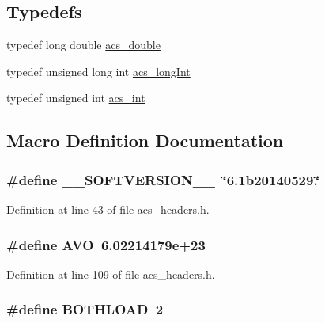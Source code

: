 \subsection*{Typedefs}
\begin{DoxyCompactItemize}
\item 
typedef long double \hyperlink{a00051_ab776853a005fcbf56af0424a2a4dd607}{acs\+\_\+double}
\item 
typedef unsigned long int \hyperlink{a00051_a19319d75f02db4308bc5c0026d98cd85}{acs\+\_\+long\+Int}
\item 
typedef unsigned int \hyperlink{a00051_a8d277355641a098190360234e2ebde35}{acs\+\_\+int}
\end{DoxyCompactItemize}


\subsection{Macro Definition Documentation}
\hypertarget{a00051_aab38659c2fe462437b89a1e85e619dc7}{
\subsubsection[{\+\_\+\+\_\+\+S\+O\+F\+T\+V\+E\+R\+S\+I\+O\+N\+\_\+\+\_\+}]{\setlength{\rightskip}{0pt plus 5cm}\#define \+\_\+\+\_\+\+S\+O\+F\+T\+V\+E\+R\+S\+I\+O\+N\+\_\+\+\_\+~\char`\"{}6.\+1b20140529.\char`\"{}}}\label{a00051_aab38659c2fe462437b89a1e85e619dc7}


Definition at line 43 of file acs\+\_\+headers.\+h.

\hypertarget{a00051_a174754c04acfba9e1f66ba249e68643a}{
\subsubsection[{A\+V\+O}]{\setlength{\rightskip}{0pt plus 5cm}\#define A\+V\+O~6.\+02214179e+23}}\label{a00051_a174754c04acfba9e1f66ba249e68643a}


Definition at line 109 of file acs\+\_\+headers.\+h.

\hypertarget{a00051_afb6d1105a81463fbadceff0217332f68}{
\subsubsection[{B\+O\+T\+H\+L\+O\+A\+D}]{\setlength{\rightskip}{0pt plus 5cm}\#define B\+O\+T\+H\+L\+O\+A\+D~2}}\label{a00051_afb6d1105a81463fbadceff0217332f68}


